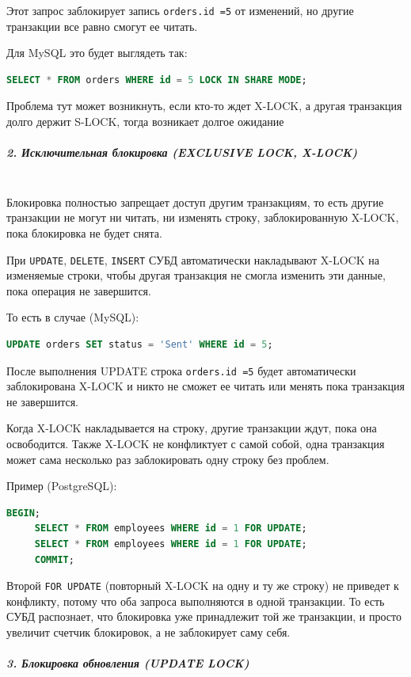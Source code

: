  Этот запрос заблокирует запись \texttt{orders.id =5} от изменений, но другие транзакции все равно смогут ее читать.
 
 Для MySQL это будет выглядеть так:
 \begin{lstlisting}[language=SQL]
     SELECT * FROM orders WHERE id = 5 LOCK IN SHARE MODE;  
 \end{lstlisting}
 
 Проблема тут может возникнуть, если кто-то ждет X-LOCK, а другая транзакция долго держит S-LOCK, тогда возникает долгое ожидание
 
 \subparagraph{2. Исключительная блокировка (EXCLUSIVE LOCK, X-LOCK)} ~\\

 Блокировка полностью запрещает доступ другим транзакциям, то есть другие транзакции не могут ни читать, ни изменять строку, заблокированную X-LOCK, пока блокировка не будет снята.
 
 При \texttt{UPDATE}, \texttt{DELETE}, \texttt{INSERT} СУБД автоматически накладывают X-LOCK на изменяемые строки, чтобы другая транзакция не смогла изменить эти данные, пока операция не завершится.
 
 То есть в случае (MySQL):
 \begin{lstlisting}[language=SQL]
     UPDATE orders SET status = 'Sent' WHERE id = 5; 
 \end{lstlisting}

 После выполнения UPDATE строка \texttt{orders.id =5} будет автоматически заблокирована X-LOCK и никто не сможет ее читать или менять пока транзакция не завершится.
 
 Когда X-LOCK накладывается на строку, другие транзакции ждут, пока она освободится. Также X-LOCK не конфликтует с самой собой, одна транзакция может сама несколько раз заблокировать одну строку без проблем.
 
 Пример (PostgreSQL):
 \begin{lstlisting}[language=SQL]
     BEGIN;
     SELECT * FROM employees WHERE id = 1 FOR UPDATE;
     SELECT * FROM employees WHERE id = 1 FOR UPDATE;
     COMMIT;    
 \end{lstlisting}

Второй \texttt{FOR UPDATE} (повторный X-LOCK на одну и ту же строку) не приведет к конфликту, потому что оба запроса выполняются в одной транзакции. То есть СУБД распознает, что блокировка уже принадлежит той же транзакции, и просто увеличит счетчик блокировок, а не заблокирует саму себя.
 
 \subparagraph{3. Блокировка обновления (UPDATE LOCK)} ~\\

